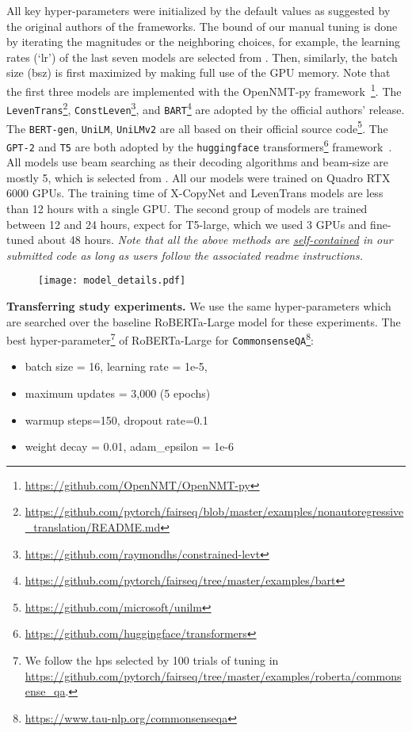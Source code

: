 \documentclass[11pt,a4paper]{article}
\begin{document}
All key hyper-parameters were initialized by the default values as suggested by the original authors of the frameworks.
The bound of our manual tuning is done by iterating the magnitudes or the neighboring choices, for example, the learning rates (`lr') of the last seven models  are selected from .
Then, similarly, the batch size (bsz) is first maximized by making full use of the GPU memory.
Note that the first three models are implemented with the OpenNMT-py framework~\footnote{\url{https://github.com/OpenNMT/OpenNMT-py}}.
The \texttt{LevenTrans}\footnote{\url{https://github.com/pytorch/fairseq/blob/master/examples/nonautoregressive_translation/README.md}}, \texttt{ConstLeven}\footnote{\url{https://github.com/raymondhs/constrained-levt}}, and \texttt{BART}\footnote{\url{https://github.com/pytorch/fairseq/tree/master/examples/bart}} are adopted by the official authors' release.
The \texttt{BERT-gen}, \texttt{UniLM}, \texttt{UniLMv2} are all based on their official source code\footnote{\url{https://github.com/microsoft/unilm}}.
The \texttt{GPT-2} and \texttt{T5} are both adopted by the \texttt{huggingface} transformers\footnote{\url{https://github.com/huggingface/transformers}} framework~\cite{Wolf2019HuggingFacesTS}.
All models use beam searching as their decoding algorithms and beam-size are mostly 5, which is selected from .
All our models were trained on Quadro RTX 6000 GPUs.
The training time of X-CopyNet and LevenTrans models are less than 12 hours with a single GPU.
The second group of models are trained between 12 and 24 hours, expect for T5-large, which we used 3 GPUs and fine-tuned about 48 hours.
\textit{Note that all the above methods are \underline{self-contained} in our submitted code as long as users follow the associated readme instructions.}
\begin{figure}[t!]
	\centering
	\texttt{[image: model\_details.pdf]}
\label{tab:model_details}
\end{figure}

\textbf{Transferring study experiments.}\quad 
 We use the same hyper-parameters which are searched over the baseline RoBERTa-Large model for these experiments. 
 The best hyper-parameter\footnote{We follow the hps selected by 100 trials of tuning in \url{https://github.com/pytorch/fairseq/tree/master/examples/roberta/commonsense_qa}.} of RoBERTa-Large for \texttt{CommonsenseQA}\footnote{\url{https://www.tau-nlp.org/commonsenseqa}}: 
 \begin{itemize}
     \item batch size = 16, learning rate = 1e-5,
     \item maximum updates = 3,000 (5 epochs) \item warmup steps=150, dropout rate=0.1
     \item weight decay = 0.01, adam\_epsilon = 1e-6
 \end{itemize}
 
\end{document}
